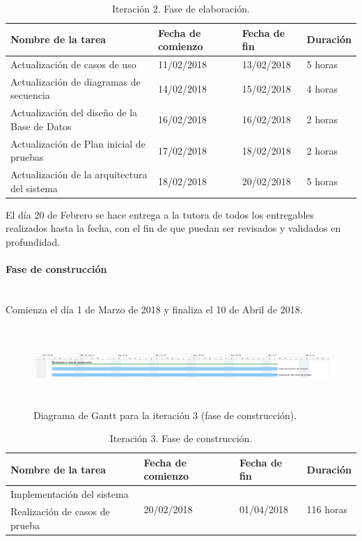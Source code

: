 \documentclass[twoside]{report}
\begin{document}
\begin{table}[H]
\centering
\begin{tabular}{|l|l|l|l|}
\hline
Nombre de la tarea                           & Fecha de comienzo & Fecha de fin & Duración \\ \hline
Actualización de casos de uso                & 11/02/2018        & 13/02/2018   & 5 horas   \\ \hline
Actualización de diagramas de secuencia      & 14/02/2018        & 15/02/2018   & 4 horas   \\ \hline
Actualización del diseño de la Base de Datos & 16/02/2018        & 16/02/2018   & 2 horas   \\ \hline
Actualización de Plan inicial de pruebas     & 17/02/2018        & 18/02/2018   & 2 horas   \\ \hline
Actualización de la arquitectura del sistema & 18/02/2018        & 20/02/2018   & 5 horas   \\ \hline
\end{tabular}
\caption{Iteración 2. Fase de elaboración.}
\end{table}

El día 20 de Febrero se hace entrega a la tutora de todos los entregables realizados hasta la fecha, con el fin de que puedan ser revisados y validados en profundidad.


\paragraph{Fase de construcción}\mbox{}\\

Comienza el día 1 de Marzo de 2018 y finaliza el 10 de Abril de 2018.

\begin{figure}[h]
\begin{center}
\includegraphics[height=3cm,width=\textwidth]{images/gantt/ite3}
\caption{Diagrama de Gantt para la iteración 3 (fase de construcción).}
\end{center}
\end{figure}


\begin{table}[H]
\centering
\begin{tabular}{|l|l|l|l|}
\hline
Nombre de la tarea             & Fecha de comienzo & Fecha de fin & Duración \\ \hline
Implementación del sistema & \multirow{2}{*}{20/02/2018}  & \multirow{2}{*}{01/04/2018}   & \multirow{2}{*}{116 horas}  \\
Realización de casos de prueba & & & \\
\hline
\end{tabular}
\caption{Iteración 3. Fase de construcción.}
\end{table}
\end{document}
